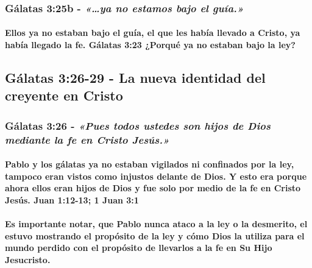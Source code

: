 \documentclass[11a pt,twoside]{article}
\newcommand{\scripture}[1]{%
  {\fontsize{12pt}{16pt}\selectfont\ScriptureFont\itshape #1}%
}
\let\oldsubsection\subsection
\renewcommand{\subsection}{\needspace{5\baselineskip}\oldsubsection}
\let\oldsubsubsection\subsubsection
\renewcommand{\subsubsection}{\needspace{4\baselineskip}\oldsubsubsection}
\let\oldparagraph\paragraph
\renewcommand{\paragraph}{\needspace{3\baselineskip}\oldparagraph}
\begin{document}
\subsubsection{\texorpdfstring{Gálatas 3:25b -
\scripture{«…ya no estamos bajo el guía.»}}{Gálatas 3:25b - }}\label{guxe1latas-325b---ya-no-estamos-bajo-el-guuxeda.}

\paragraph{Ellos ya no estaban bajo el guía, el que les había llevado a
Cristo, ya había llegado la fe. Gálatas 3:23 ¿Porqué ya no estaban bajo
la
ley?}\label{ellos-ya-no-estaban-bajo-el-guuxeda-el-que-les-habuxeda-llevado-a-cristo-ya-habuxeda-llegado-la-fe.-guxe1latas-323-porquuxe9-ya-no-estaban-bajo-la-ley}

\subsection{Gálatas 3:26-29 - La nueva identidad del creyente en
Cristo}\label{guxe1latas-326-29---la-nueva-identidad-del-creyente-en-cristo}

\subsubsection{\texorpdfstring{Gálatas 3:26 -
\scripture{«Pues todos ustedes son hijos de Dios mediante la fe en Cristo Jesús.»}}{Gálatas 3:26 - }}\label{guxe1latas-326---pues-todos-ustedes-son-hijos-de-dios-mediante-la-fe-en-cristo-jesuxfas.}

\paragraph{Pablo y los gálatas ya no estaban vigilados ni confinados por
la ley, tampoco eran vistos como injustos delante de Dios. Y esto era
porque ahora ellos eran hijos de Dios y fue solo por medio de la fe en
Cristo Jesús. Juan 1:12-13; 1 Juan
3:1}\label{pablo-y-los-guxe1latas-ya-no-estaban-vigilados-ni-confinados-por-la-ley-tampoco-eran-vistos-como-injustos-delante-de-dios.-y-esto-era-porque-ahora-ellos-eran-hijos-de-dios-y-fue-solo-por-medio-de-la-fe-en-cristo-jesuxfas.-juan-112-13-1-juan-31}

\paragraph{Es importante notar, que Pablo nunca ataco a la ley o la
desmerito, el estuvo mostrando el propósito de la ley y cómo Dios la
utiliza para el mundo perdido con el propósito de llevarlos a la fe en
Su Hijo
Jesucristo.}\label{es-importante-notar-que-pablo-nunca-ataco-a-la-ley-o-la-desmerito-el-estuvo-mostrando-el-propuxf3sito-de-la-ley-y-cuxf3mo-dios-la-utiliza-para-el-mundo-perdido-con-el-propuxf3sito-de-llevarlos-a-la-fe-en-su-hijo-jesucristo.}
\end{document}
